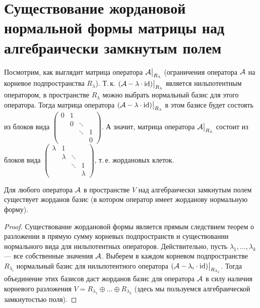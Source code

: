 \section{Существование жордановой нормальной формы матрицы над алгебраически замкнутым полем}

Посмотрим, как выглядит матрица оператора $\mathcal{A}\big|_{R_\lambda}$ (ограничения оператора $\mathcal{A}$ на корневое подпространства $R_\lambda$). Т.\,к. $(\mathcal{A} - \lambda \cdot \operatorname{id})\big|_{R_\lambda}$ является нильпотентным оператором, в пространстве $R_\lambda$ можно выбрать нормальный базис для этого оператора. Тогда матрица оператора $(\mathcal{A} - \lambda \cdot \operatorname{id})\big|_{R_\lambda}$ в этом базисе будет состоять из блоков вида
$
\begin{pmatrix}
    0 & 1 &  &  \\
      & 0 & \ddots & \\
      & & \ddots & 1\\
      & & & 0
\end{pmatrix}
$. А значит, матрица оператора $\mathcal{A}\big|_{R_\lambda}$ состоит из блоков вида
$
\begin{pmatrix}
    \lambda & 1 &  &  \\
      & \lambda & \ddots & \\
      & & \ddots & 1\\
      & & & \lambda
\end{pmatrix}
$, т.\,е. жордановых клеток.

\begin{theorem}
    Для любого оператора $\mathcal{A}$ в пространстве $V$ над алгебраически замкнутым полем существует жорданов базис (в котором оператор имеет жорданову нормальную форму).
\end{theorem}

\begin{proof}
    Существование жордановой формы является прямым следствием теорем о разложении в прямую сумму корневых подпространств и существовании нормального вида для нильпотентных операторов. Действительно, пусть $\lambda_1, \ldots, \lambda_k$ --- все собственные значения $\mathcal{A}$. Выберем в каждом корневом подпространстве $R_{\lambda_i}$ нормальный базис для нильпотентного оператора $(\mathcal{A} - \lambda_i \cdot \operatorname{id})\big|_{R_{\lambda_i}}$. Тогда объединение этих базисов даст жорданов базис для оператора $\mathcal{A}$ в силу наличия корневого разложения $V = R_{\lambda_1} \oplus \ldots \oplus R_{\lambda_k}$ (здесь мы пользуемся алгебраической замкнутостью поля).
\end{proof}

